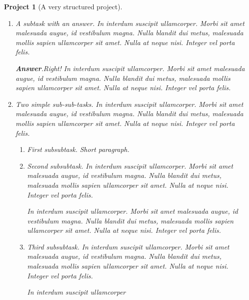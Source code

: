 \documentclass{sn-jnl}
\theoremstyle{thmstyleone}%
\theoremstyle{thmstyletwo}%
\newtheorem{project}[theorem]{Project}
\theoremstyle{thmstylethree}%
\newcommand{\blocktitlefont}{\relax}
\numberwithin{equation}{section}
\begin{document}
\begin{project}[A very structured project]
\begin{enumerate}[font=\bfseries,label=(\alph*),ref=\alph*]
\begin{enumerate}[font=\bfseries,label=(\roman*),ref=\theenumi.\roman*]
A short paragraph, before an answer.%
\par\smallskip%
\noindent\textbf{\blocktitlefont Answer}.\hypertarget{project-structured-6-2-2}{}\quad{}With a proof.%
\begin{proof}\label{project-structured-6-2-2-2}%
In interdum suscipit ullamcorper. Morbi sit amet malesuada augue, id vestibulum magna. Nulla blandit dui metus, malesuada mollis sapien ullamcorper sit amet. Nulla at neque nisi. Integer vel porta felis.%
\end{proof}
And a bit more to say.%
\item{}A subtask with an answer.  In interdum suscipit ullamcorper. Morbi sit amet malesuada augue, id vestibulum magna. Nulla blandit dui metus, malesuada mollis sapien ullamcorper sit amet. Nulla at neque nisi. Integer vel porta felis.%
\par\smallskip%
\noindent\textbf{\blocktitlefont Answer}.\hypertarget{project-structured-6-3-2}{}\quad{}Right!  In interdum suscipit ullamcorper. Morbi sit amet malesuada augue, id vestibulum magna. Nulla blandit dui metus, malesuada mollis sapien ullamcorper sit amet. Nulla at neque nisi. Integer vel porta felis.%
\item\label{project-task-level-two}Two simple sub-sub-tasks.  In interdum suscipit ullamcorper. Morbi sit amet malesuada augue, id vestibulum magna. Nulla blandit dui metus, malesuada mollis sapien ullamcorper sit amet. Nulla at neque nisi. Integer vel porta felis.%
\begin{enumerate}[font=\bfseries,label=(\Alph*),ref=\theenumi.\theenumii.\Alph*]%
\item{}First subsubtask.  Short paragraph.%
\item{}Second subsubtask.  In interdum suscipit ullamcorper. Morbi sit amet malesuada augue, id vestibulum magna. Nulla blandit dui metus, malesuada mollis sapien ullamcorper sit amet. Nulla at neque nisi. Integer vel porta felis.%
\par
In interdum suscipit ullamcorper. Morbi sit amet malesuada augue, id vestibulum magna. Nulla blandit dui metus, malesuada mollis sapien ullamcorper sit amet. Nulla at neque nisi. Integer vel porta felis.%
\item\label{deep-terminal-task}Third subsubtask.  In interdum suscipit ullamcorper. Morbi sit amet malesuada augue, id vestibulum magna. Nulla blandit dui metus, malesuada mollis sapien ullamcorper sit amet. Nulla at neque nisi. Integer vel porta felis.%
\par
In interdum suscipit ullamcorper%

\end{enumerate}
\end{enumerate}
\end{enumerate}
\end{project}
\end{document}
